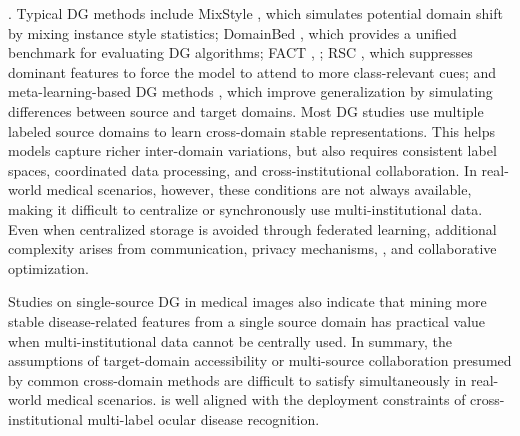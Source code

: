  \cite{_Ref213949554}.  Typical DG methods include MixStyle \cite{_Ref213949562}, which simulates potential domain shift by mixing instance style statistics; DomainBed \cite{_Ref213949607}, which provides a unified benchmark for evaluating DG algorithms; FACT \cite{_Ref213949788}, ; RSC \cite{_Ref213949796}, which suppresses dominant features to force the model to attend to more class-relevant cues; and meta-learning-based DG methods \cite{_Ref213949803}, which improve generalization by simulating differences between source and target domains. Most DG studies use multiple labeled source domains to learn cross-domain stable representations. This helps models capture richer inter-domain variations, but also requires consistent label spaces, coordinated data processing, and cross-institutional collaboration. In real-world medical scenarios, however, these conditions are not always available, making it difficult to centralize or synchronously use multi-institutional data. Even when centralized storage is avoided through federated learning, additional complexity arises from communication, privacy mechanisms, , and collaborative optimization.

 Studies on single-source DG in medical images \cite{_Ref213949863} also indicate that mining more stable disease-related features from a single source domain has practical value when multi-institutional data cannot be centrally used. In summary, the assumptions of target-domain accessibility or multi-source collaboration presumed by common cross-domain methods are difficult to satisfy simultaneously in real-world medical scenarios.  is well aligned with the deployment constraints of cross-institutional multi-label ocular disease recognition.

